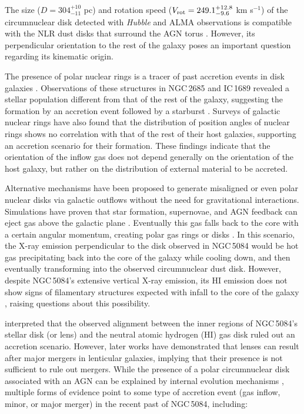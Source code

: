 \documentclass[modern]{CORE-AAS/aastex631}
\begin{document}
{The size ($D=304^{+10}_{-11}$ pc) and rotation speed ($V_{\rm rot} = 249.1^{+12.8}_{-9.6}$ km s$^{-1}$) of the circumnuclear disk detected with \emph{Hubble} and ALMA observations is compatible with the NLR dust disks that surround the AGN torus \citep[][]{ramosalmeida+2017nat1_679}. However, its perpendicular orientation to the rest of the galaxy poses an important question regarding its kinematic origin. \par 

The presence of polar nuclear rings is a tracer of past accretion events in disk galaxies \citep{anantharamaiah+1996apj466_13}. Observations of these structures in NGC\,2685 and IC\,1689 revealed a stellar population different from that of the rest of the galaxy, suggesting the formation by an accretion event followed by a starburst \citep{silchenko1998aap330_412}. Surveys of galactic nuclear rings \citep{comeron+2010mnras402_2462} have also found that the distribution of position angles of nuclear rings shows no correlation with that of the rest of their host galaxies, supporting an accretion scenario for their formation. These findings indicate that the orientation of the inflow gas does not depend generally on the orientation of the host galaxy, but rather on the distribution of external material to be accreted. 

Alternative mechanisms have been proposed to generate misaligned or even polar nuclear disks via galactic outflows without the need for gravitational interactions. Simulations have proven that star formation, supernovae, and AGN feedback can eject gas above the galactic plane \citep{emsellem+2015mnras446_2468, renaud+2015mnras454_3299}. Eventually this gas falls back to the core with a certain angular momentum, creating polar gas rings or disks \citep{combes2017inproceedings_Di}. In this scenario, the X-ray emission perpendicular to the disk observed in NGC\,5084 would be hot gas precipitating back into the core of the galaxy while cooling down, and then eventually transforming into the observed circumnuclear dust disk. However, despite NGC\,5084's extensive vertical X-ray emission, its HI emission does not show signs of filamentary structures expected with infall to the core of the galaxy  \citep{zheng+2022afz22_085004}, raising questions about this possibility.

\citet{gottesman+1986mnras219_759} interpreted that the observed alignment between the inner regions of NGC\,5084's stellar disk (or lens) and the neutral atomic hydrogen (HI) gas disk ruled out an accretion scenario. However, later works \citep{elichemoral+2018aap617_113} have demonstrated that lenses can result after major mergers in lenticular galaxies, implying that their presence is not sufficient to rule out mergers. While the presence of a polar circumnuclear disk associated with an AGN can be explained by internal evolution mechanisms \citep[outflow gas cooling and subsequent precipitation onto the core,][]{combes2017inproceedings_Di}, multiple forms of evidence point to some type of accretion event (gas inflow, minor, or major merger) in the recent past of NGC\,5084, including:

}
\end{document}
